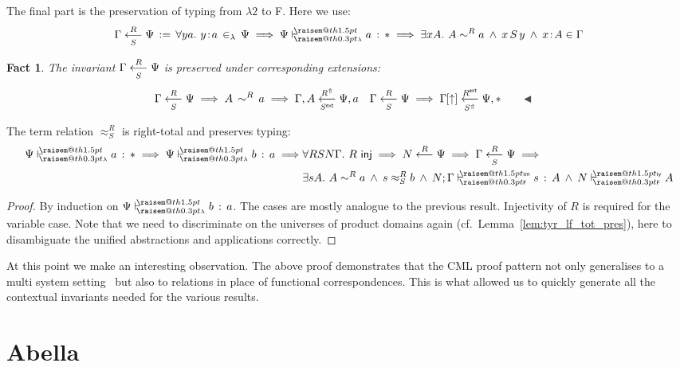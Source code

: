 \documentclass[a4paper,UKenglish]{lipics-v2016}
\makeatletter
\newcommand{\ms}{\,}
\newcommand{\mrel}[1]{\mathrel{\ms #1 \ms}}
\newcommand{\OF}{\mrel{:}}
\newcommand{\mAnd}{\mrel{\wedge}}
\newcommand{\mAll}[1]{\ensuremath{\forall} #1.\ms\ms}
\newcommand{\mEx}[1]{\ensuremath{\exists} #1.\ms\ms}
\newcommand{\eqdef}{\mrel{:=}}
\newcommand{\SysL}{$\lambda2$\xspace}
\newcommand{\ty}{\mathsf{ty}}
\newcommand{\tm}{\mathsf{tm}}
\newcommand{\of}{\ensuremath{\!:\!}}
\newcommand{\cc}[2]{#1;#2} %
\newcommand{\raisemath}[1]{\mathpalette{\raisem@th{#1}}}
\newcommand{\raisem@th}[3]{\raisebox{#1}{\ensuremath{#2#3}}}
\newcommand{\tsAnnot}[2]{\vdash\hspace{-.7em}^{\raisemath{1.5pt}{\scriptscriptstyle{#2}}}_{\raisemath{0.3pt}{\scriptscriptstyle{#1}}}} %
\newcommand{\tfF}{\tsAnnot{\mathsf{F}}{\ty}}  %
\newcommand{\tyF}{\tsAnnot{\mathsf{F}}{\tm}}  %
\newcommand{\istyF}[2]{\ensuremath{{#1} \mathrel{\tfF} #2}}
\newcommand{\typingF}[3]{\ensuremath{{#1} \mathrel{\tyF} #2 \OF #3}}
\newcommand{\tyL}{\tsAnnot{\lambda}{}} %
\newcommand{\typingL}[3]{\ensuremath{{#1} \mathrel{\tyL} #2 \OF #3}}
\newcommand{\inL}{\mrel{\in_{\lambda}}}
\newcommand{\tyr}{\mathrel{\sim}}
\newcommand{\tmr}{\mathrel{\approx}}
\newcommand{\Rext}[1]{\ensuremath{#1^{\mathsf{ext}}}}
\newcommand{\Rshift}[1]{\ensuremath{#1^{\Uparrow}}}
\newcommand{\tyctxrelLF}[3]{\ensuremath{#1\mathrel{\mathop{\longleftarrow}^{#2}\limits}#3}}
\newcommand{\tmctxrelLF}[4]{\ensuremath{#1\mathrel{\mathop{\longleftarrow}^{#2}_{#3}\limits}#4}}
\newcommand{\Prp}{\ensuremath{\textrm{\textasteriskcentered}}}
\newcommand{\subst}[1]{\hphantom{|}\!\![{#1}]}
\newcommand{\shift}{\ensuremath{\uparrow}}
\theoremstyle{plain}
\newtheorem{fact}[theorem]{Fact}
\makeatother
\begin{document}
The final part is the preservation of typing from \SysL to F.
Here we use:
\begin{align*}
  \tmctxrelLF{\Gamma}{R}{S}{\Psi} \eqdef \mAll{y a} y \of a \inL \Psi \implies \typingL{\Psi}{a}{\Prp} \implies \mEx{x A} A \tyr^R a \mAnd x\,S\,y \mAnd x \of A \in \Gamma
\end{align*}
\begin{fact}
  \label{fac:inv-tmfl-ext}
  The invariant $\tmctxrelLF{\Gamma}{R}{S}{\Psi}$ is preserved under corresponding extensions:
  \begin{align*}
    &\tmctxrelLF{\Gamma}{R}{S}{\Psi} \implies A\,\tyr^R\,a \implies \tmctxrelLF{\Gamma,A}{\Rshift{R}}{\Rext{S}}{\Psi,a} & &\tmctxrelLF{\Gamma}{R}{S}{\Psi} \implies \tmctxrelLF{\Gamma\subst{\shift}}{\Rext{R}}{\Rshift{S}}{\Psi,\Prp}\tag*{\qedsymbol}
  \end{align*}
\end{fact}
\begin{lemma}
  The term relation $\tmr^R_S$ is right-total and preserves typing:
  \begin{align*}
    \typingL{\Psi}{a}{\Prp} \implies \typingL{\Psi}{b}{a} \implies &\mAll{R S N \Gamma} R\ms\ms\mathsf{inj} \implies \tyctxrelLF{N}{R}{\Psi} \implies \tmctxrelLF{\Gamma}{R}{S}{\Psi} \implies \\
                                                                &\mEx{s A} A \tyr^R a \mAnd s \tmr^R_S b \mAnd \typingF{\cc{N}{\Gamma}}{s}{A} \mAnd \istyF{N}{A}
  \end{align*}
\end{lemma}
\begin{proof}
  By induction on $\typingL{\Psi}{b}{a}$.
  The cases are mostly analogue to the previous result.
  Injectivity of $R$ is required for the variable case.
  Note that we need to discriminate on the universes of product domains again (cf.\ Lemma~\ref{lem:tyr_lf_tot_pres}), here to disambiguate the unified abstractions and applications correctly.
\end{proof}

At this point we make an interesting observation.
The above proof demonstrates that the CML proof pattern not only generalises to a multi system setting~\cite{KaiserEtAl:2017:sysf_pts_equiv_coq} but also to relations in place of functional correspondences.
This is what allowed us to quickly generate all the contextual invariants needed for the various results.

\section{Abella}
\label{sec:abella}
\end{document}
